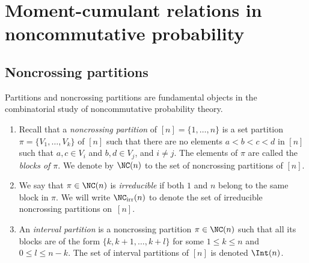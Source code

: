\section{Moment-cumulant relations in noncommutative probability}\label{sec:momentcumulantrel}

\subsection{Noncrossing partitions}

Partitions and noncrossing partitions are fundamental objects in the combinatorial study of noncommutative probability theory.
\begin{Definition}\quad
\begin{enumerate}\itemsep=0pt
\item Recall that a \textit{noncrossing partition} of $[n] = \{1,\dots,n\}$ is a set partition $\pi = \{V_1,\dots,V_k\}$ of $[n]$ such that there are no elements $a<b<c<d$ in $[n]$ such that $a,c \in V_i$ and $b,d \in V_j$, and $i\neq j$. The elements of $\pi$ are called the \textit{blocks of $\pi$}. We denote by $\NC(n)$ to the set of noncrossing partitions of $[n]$.
\item We say that $\pi \in \NC(n)$ is \textit{irreducible} if both $1$ and $n$ belong to the same block in $\pi$. We will write $\NC_{\mathrm{irr}}(n)$ to denote the set of irreducible noncrossing partitions on~$[n]$.
\item An \textit{interval partition} is a noncrossing partition $\pi\in\NC(n)$ such that all its blocks are of the form $\{k,k+1,\dots,k+l\}$ for some $1\leq k\leq n$ and $0\leq l\leq n-k$. The set of interval partitions of $[n]$ is denoted $\Int(n)$.
\end{enumerate}
\end{Definition}


